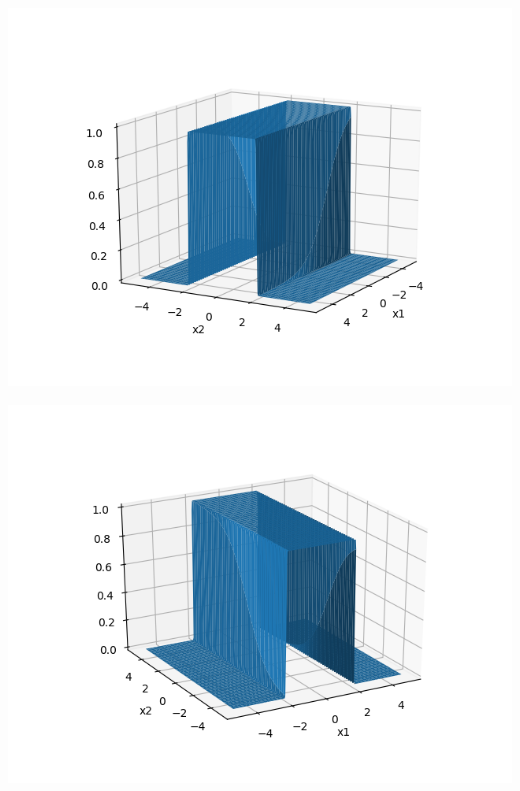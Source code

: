 \documentclass[solution,addpoints,12pt]{exam}
\begin{document}
\begin{questions}
\begin{parts}
\begin{solution}
                  		\begin{center}
                  			\includegraphics[scale=0.8]{h_21}
                  			\label{fig:h21}
                  		\end{center}
                  		
                  		\begin{center}
                  			\includegraphics[scale=0.8]{h_22}
                  			\label{fig:h22}
                  		\end{center}
                  		

\end{solution}
\end{parts}
\end{questions}
\end{document}

